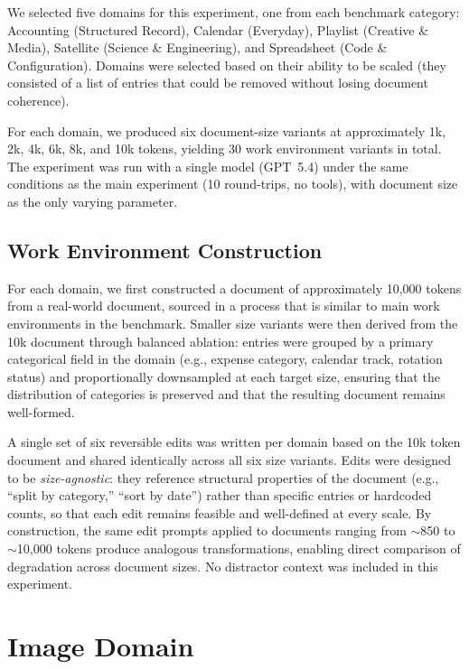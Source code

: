 \documentclass{article} %
\begin{document}
We selected five domains for this experiment, one from each benchmark category: Accounting (Structured Record), Calendar (Everyday), Playlist (Creative \& Media), Satellite (Science \& Engineering), and Spreadsheet (Code \& Configuration). Domains were selected based on their ability to be scaled (they consisted of a list of entries that could be removed without losing document coherence).

For each domain, we produced six document-size variants at approximately 1k, 2k, 4k, 6k, 8k, and 10k tokens, yielding 30 work environment variants in total. The experiment was run with a single model (GPT~5.4) under the same conditions as the main experiment (10 round-trips, no tools), with document size as the only varying parameter.

\subsection{Work Environment Construction}

For each domain, we first constructed a document of approximately 10,000 tokens from a real-world document, sourced in a process that is similar to main work environments in the benchmark. Smaller size variants were then derived from the 10k document through balanced ablation: entries were grouped by a primary categorical field in the domain (e.g., expense category, calendar track, rotation status) and proportionally downsampled at each target size, ensuring that the distribution of categories is preserved and that the resulting document remains well-formed.

A single set of six reversible edits was written per domain based on the 10k token document and shared identically across all six size variants. Edits were designed to be \textit{size-agnostic}: they reference structural properties of the document (e.g., ``split by category,'' ``sort by date'') rather than specific entries or hardcoded counts, so that each edit remains feasible and well-defined at every scale. By construction, the same edit prompts applied to documents ranging from ${\sim}$850 to ${\sim}$10,000 tokens produce analogous transformations, enabling direct comparison of degradation across document sizes. No distractor context was included in this experiment.


\section{Image Domain} \label{app:image_domain}
\end{document}
